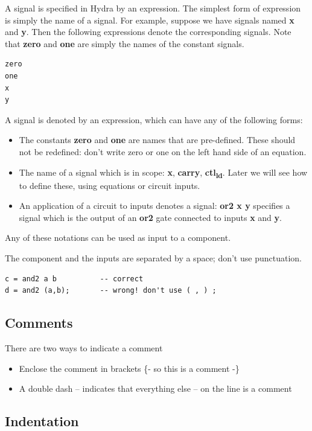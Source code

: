 \documentclass[]{svmono}
\begin{document}
A signal is specified in Hydra by an expression.  The simplest
form of expression is simply the name of a signal.  For example,
suppose we have signals named \textbf{x} and \textbf{y}.  Then the following
expressions denote the corresponding signals.  Note that \textbf{zero}
and \textbf{one} are simply the names of the constant signals.

\begin{verbatim}
zero
one
x
y
\end{verbatim}

A signal is denoted by an expression, which can have any of the
following forms:

\begin{itemize}
\item The constants \textbf{zero} and \textbf{one} are names that are pre-defined.
These should not be redefined: don't write zero or one on the
left hand side of an equation.

\item The name of a signal which is in scope: \textbf{x}, \textbf{carry}, \textbf{ctl\textsubscript{ld}}.
Later we will see how to define these, using equations or
circuit inputs.

\item An application of a circuit to inputs denotes a signal: \textbf{or2 x
y} specifies a signal which is the output of an \textbf{or2} gate
connected to inputs \textbf{x} and \textbf{y}.
\end{itemize}

Any of these notations can be used as input to a component.

The component and the inputs are separated by a space; don't use
punctuation.

\begin{verbatim}
c = and2 a b          -- correct
d = and2 (a,b);       -- wrong! don't use ( , ) ;
\end{verbatim}
\subsection*{Comments}
\label{sec:org348a443}
There are two ways to indicate a comment
\begin{itemize}
\item Enclose the comment in brackets \{- so this is a comment -\}
\item A double dash -- indicates that everything else -- on the line
is a comment
\end{itemize}
\subsection*{Indentation}
\label{sec:org9740098}
\end{document}
